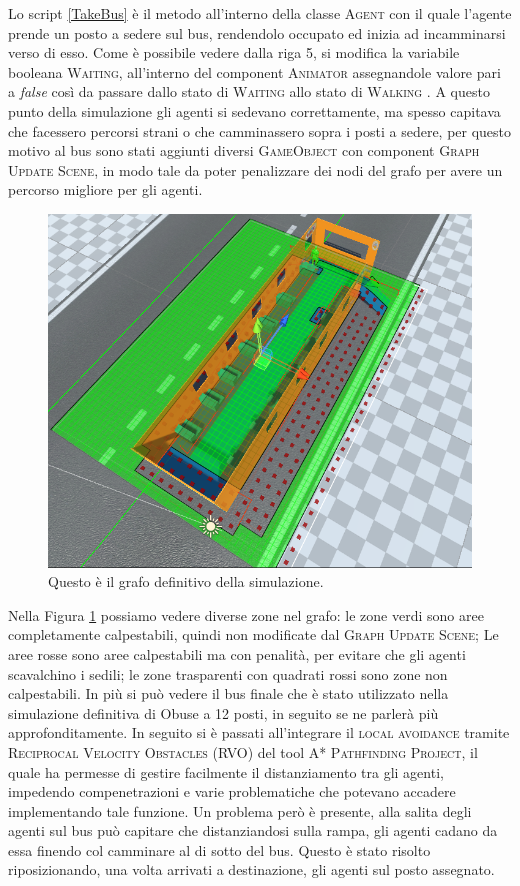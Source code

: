 \documentclass[12pt, openany]{book}
\begin{document}
	Lo script \ref{TakeBus} è il metodo all'interno della classe \textsc{Agent} con il quale l'agente prende un posto a sedere sul bus, rendendolo occupato ed inizia ad incamminarsi verso di esso. Come è possibile vedere dalla riga 5, si modifica la variabile booleana \textsc{Waiting}, all'interno del component \textsc{Animator} assegnandole valore pari a \emph{false} così da passare dallo stato di \textsc{Waiting} allo stato di \textsc{Walking} .  \newpage
	A questo punto della simulazione gli agenti si sedevano correttamente, ma spesso capitava che facessero percorsi strani o che camminassero sopra i posti a sedere, per questo motivo al bus sono stati aggiunti diversi \textsc{GameObject} con component \textsc{Graph Update Scene}, in modo tale da poter penalizzare dei nodi del grafo per avere un percorso migliore per gli agenti.
	\begin{figure}[H]
		\centering
		\includegraphics[width=1\linewidth]{"Immagini/AreaGrafo.png"}
		\caption{Questo è il grafo definitivo della simulazione.}
		\label{fig:AreaGrafo}
	\end{figure}
	Nella Figura \ref{fig:AreaGrafo} possiamo vedere diverse zone nel grafo: le zone verdi sono aree completamente calpestabili, quindi non modificate dal \textsc{Graph Update Scene}; Le aree rosse sono aree calpestabili ma con penalità, per evitare che gli agenti scavalchino i sedili; le zone trasparenti con quadrati rossi sono zone non calpestabili. In più si può vedere il bus finale che è stato utilizzato nella simulazione definitiva di Obuse a 12 posti, in seguito se ne parlerà più approfonditamente.
	In seguito si è passati all'integrare il \textsc{local avoidance} tramite \textsc{Reciprocal Velocity Obstacles (RVO)} del tool \textsc{A* Pathfinding Project}, il quale ha permesse di gestire facilmente il distanziamento tra gli agenti, impedendo compenetrazioni e varie problematiche che potevano accadere implementando tale funzione. Un problema però è presente, alla salita degli agenti sul bus può capitare che distanziandosi sulla rampa, gli agenti cadano da essa finendo col camminare al di sotto del bus. Questo è stato risolto riposizionando, una volta arrivati a destinazione, gli agenti sul posto assegnato.
	
\end{document}
